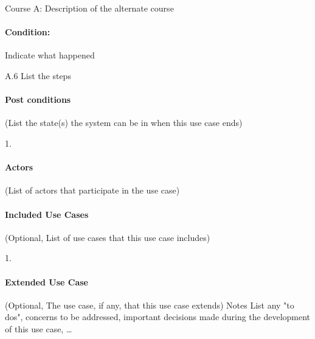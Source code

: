 \documentclass{report}
\begin{document}
  Course A: Description of the alternate course



  \paragraph{Condition:}

  Indicate what happened

  A.6 List the steps



  \paragraph{Post conditions}

  (List the state(s) the system can be in when this use case ends)

  1.



  \paragraph{Actors}

  (List of actors that participate in the use case)



  \paragraph{Included Use Cases}

  (Optional, List of use cases that this use case includes)

  1.



  \paragraph{Extended Use Case}

  (Optional, The use case, if any, that this use case extends)
  Notes
  List any "to dos", concerns to be addressed,  important decisions made during the development of this use case, …
\end{document}
